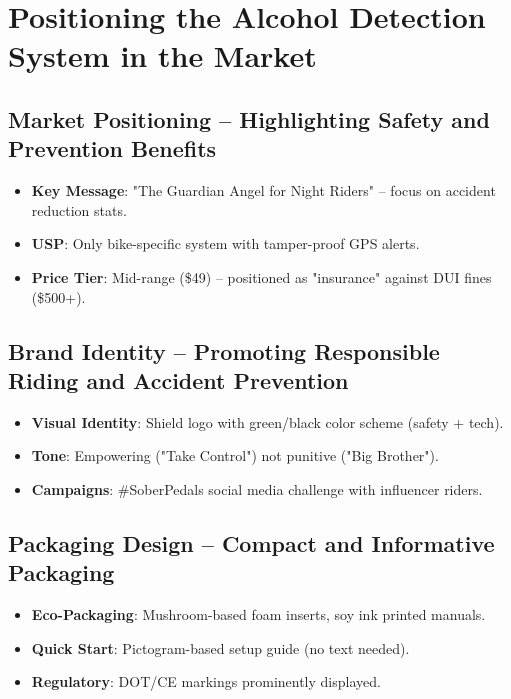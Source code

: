 \documentclass{article}
\begin{document}
\newpage

\section{Positioning the Alcohol Detection System in the Market}

\subsection{Market Positioning -- Highlighting Safety and Prevention Benefits}
\begin{itemize}
    \item \textbf{Key Message}: "The Guardian Angel for Night Riders" – focus on accident reduction stats.
    \item \textbf{USP}: Only bike-specific system with tamper-proof GPS alerts.
    \item \textbf{Price Tier}: Mid-range (\$49) – positioned as "insurance" against DUI fines (\$500+).
\end{itemize}

\subsection{Brand Identity -- Promoting Responsible Riding and Accident Prevention}
\begin{itemize}
    \item \textbf{Visual Identity}: Shield logo with green/black color scheme (safety + tech).
    \item \textbf{Tone}: Empowering ("Take Control") not punitive ("Big Brother").
    \item \textbf{Campaigns}: #SoberPedals social media challenge with influencer riders.
\end{itemize}

\subsection{Packaging Design -- Compact and Informative Packaging}
\begin{itemize}
    \item \textbf{Eco-Packaging}: Mushroom-based foam inserts, soy ink printed manuals.
    \item \textbf{Quick Start}: Pictogram-based setup guide (no text needed).
    \item \textbf{Regulatory}: DOT/CE markings prominently displayed.
\end{itemize}
\end{document}
